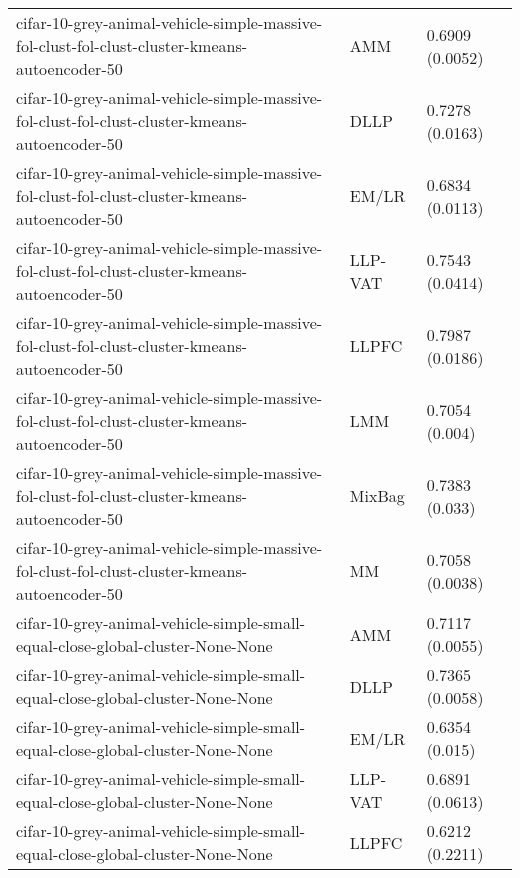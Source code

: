 \begin{longtable}{lll}
                cifar-10-grey-animal-vehicle-simple-massive-fol-clust-fol-clust-cluster-kmeans-autoencoder-50 &       AMM &                       0.6909 (0.0052) \\
                cifar-10-grey-animal-vehicle-simple-massive-fol-clust-fol-clust-cluster-kmeans-autoencoder-50 &      DLLP &                       0.7278 (0.0163) \\
                cifar-10-grey-animal-vehicle-simple-massive-fol-clust-fol-clust-cluster-kmeans-autoencoder-50 &     EM/LR &                       0.6834 (0.0113) \\
                cifar-10-grey-animal-vehicle-simple-massive-fol-clust-fol-clust-cluster-kmeans-autoencoder-50 &   LLP-VAT &                       0.7543 (0.0414) \\
                cifar-10-grey-animal-vehicle-simple-massive-fol-clust-fol-clust-cluster-kmeans-autoencoder-50 &     LLPFC &                       0.7987 (0.0186) \\
                cifar-10-grey-animal-vehicle-simple-massive-fol-clust-fol-clust-cluster-kmeans-autoencoder-50 &       LMM &                        0.7054 (0.004) \\
                cifar-10-grey-animal-vehicle-simple-massive-fol-clust-fol-clust-cluster-kmeans-autoencoder-50 &    MixBag &                        0.7383 (0.033) \\
                cifar-10-grey-animal-vehicle-simple-massive-fol-clust-fol-clust-cluster-kmeans-autoencoder-50 &        MM &                       0.7058 (0.0038) \\
                               cifar-10-grey-animal-vehicle-simple-small-equal-close-global-cluster-None-None &       AMM &                       0.7117 (0.0055) \\
                               cifar-10-grey-animal-vehicle-simple-small-equal-close-global-cluster-None-None &      DLLP &                       0.7365 (0.0058) \\
                               cifar-10-grey-animal-vehicle-simple-small-equal-close-global-cluster-None-None &     EM/LR &                        0.6354 (0.015) \\
                               cifar-10-grey-animal-vehicle-simple-small-equal-close-global-cluster-None-None &   LLP-VAT &                       0.6891 (0.0613) \\
                               cifar-10-grey-animal-vehicle-simple-small-equal-close-global-cluster-None-None &     LLPFC &                       0.6212 (0.2211) \\

\end{longtable}
